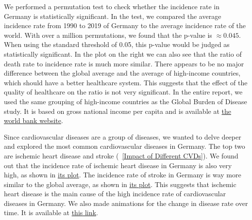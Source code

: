 We performed a permutation test to check whether the incidence rate in Germany is statistically significant. In the test, we compared the average incidence rate from 1990 to 2019 of Germany to the average incidence rate of the world. With over a million permutations, we found that the p-value is $\approx 0.045$. When using the standard threshold of 0.05, this p-value would be judged as statistically significant.
In the plot on the right we can also see that the ratio of death rate to incidence rate is much more similar. There appears to be no major difference between the global average and the average of 
high-income countries, which should have a better healthcare system. This suggests that the effect of the quality of healthcare on the ratio is not very significant. In the entire report, we used the same grouping of high-income countries
as the Global Burden of Disease study. It is based on gross national income per capita and is available at \href{https://datahelpdesk.worldbank.org/knowledgebase/articles/906519-world-bank-country-and-lending-groups}{the world bank website}. 

Since cardiovascular diseases are a group of diseases, we wanted to delve deeper and explored the most common cardiovascular diseases in Germany. The top two are ischemic heart disease and stroke (\figurename~\ref{Impact of Different CVDs}). 
We found out that the incidence rate of ischemic heart disease in Germany is also very high, as shown in \href{https://github.com/sykoravojtech/IHD_germany_2024/blob/main/doc/IHD_germany_2024/fig/fig_ischemic_rate.pdf}{its plot}.
The incidence rate of stroke in Germany is way more similar to the global average, as shown in \href{https://github.com/sykoravojtech/IHD_germany_2024/blob/main/doc/IHD_germany_2024/fig/fig_stroke_rate.pdf}{its plot}. This suggests that ischemic heart disease is the main cause of the high incidence rate of cardiovascular diseases in Germany.
We also made animations for the change in disease rate over time. It is available at \href{https://github.com/sykoravojtech/IHD_germany_2024/tree/main/exp/output/animations}{this link}.


